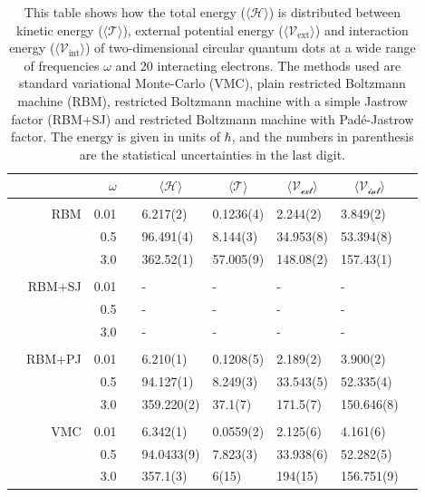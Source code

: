 \begin{table}
	\caption{This table shows how the total energy ($\langle\mathcal{H}\rangle$) is distributed between kinetic energy ($\langle\mathcal{T}\rangle$), external potential energy ($\langle\mathcal{V}_{\text{ext}}\rangle$) and interaction energy ($\langle\mathcal{V}_{\text{int}}\rangle$) of two-dimensional circular quantum dots at a wide range of frequencies $\omega$ and 20 interacting electrons. The methods used are standard variational Monte-Carlo (VMC), plain restricted Boltzmann machine (RBM), restricted Boltzmann machine with a simple Jastrow factor (RBM+SJ) and restricted Boltzmann machine with Padé-Jastrow factor. The energy is given in units of $\hbar$, and the numbers in parenthesis are the statistical uncertainties in the last digit.}
	\label{tab:splitfrequencyQD2D20P}
	\begin{tabularx}{\textwidth}{R{1cm}rrcR{2.3cm}R{2.3cm}R{2.3cm}R{2.3cm}R{0.3cm}} \hline\hline
		&\makecell{\\ \phantom{$N$} \\ \phantom{=}} & $\omega$ &&  &  &  &  \\ \hline \\
		&RBM & 0.01 && 6.217(2) & 0.1236(4) & 2.244(2) & 3.849(2) \\
		&& 0.5 && 96.491(4) & 8.144(3) & 34.953(8) & 53.394(8) \\
		&& 3.0 && 362.52(1) & 57.005(9) & 148.08(2) & 157.43(1) \\ \hdashline \\
		
		&RBM+SJ & 0.01 && - & - & - & - \\
		&& 0.5 && - & - & - & - \\
		&& 3.0 && - & - & - & - \\ \hdashline \\
		
		&RBM+PJ & 0.01 && 6.210(1) & 0.1208(5) & 2.189(2) & 3.900(2) \\
		&& 0.5 && 94.127(1) & 8.249(3) & 33.543(5) & 52.335(4) \\
		&& 3.0 && 359.220(2) & 37.1(7) & 171.5(7) & 150.646(8) \\ \hdashline \\
		
		&VMC & 0.01 && 6.342(1) & 0.0559(2) & 2.125(6) & 4.161(6) \\
		&& 0.5 && 94.0433(9) & 7.823(3) & 33.938(6) & 52.282(5) \\
		&& 3.0 && 357.1(3) & 6(15) & 194(15) & 156.751(9) \\ \hline \hline
	\end{tabularx}
\end{table} 


